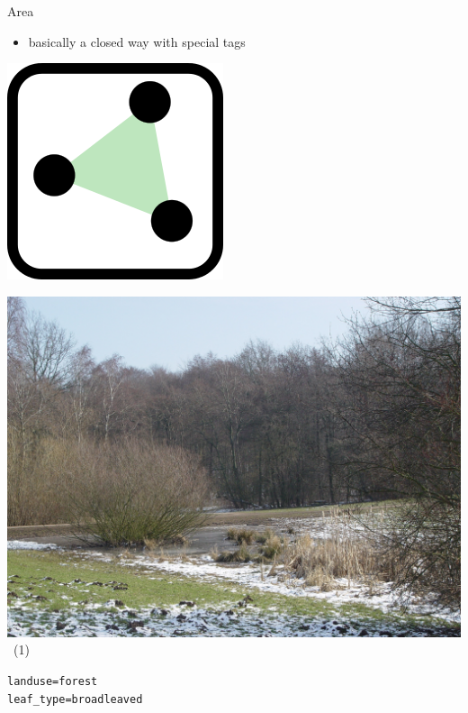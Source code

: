 \documentclass{beamer}
\begin{document}
	\begin{frame}{Area}
		\begin{itemize}
			\item basically a closed way with special tags
		\end{itemize}
		
		\vfill
		
		\begin{center}
			\begin{minipage}[b][0.6\textheight][c]{0.2\linewidth}
				\centering
				\includegraphics[width=0.5\linewidth,height=0.5\textheight,keepaspectratio]{images/240px-Mf_area.png}
			\end{minipage}
			\begin{minipage}[b][0.6\textheight][c]{0.4\linewidth}
				\centering
				\includegraphics[width=0.8\linewidth,height=0.8\textheight,keepaspectratio]{images/Stellinger_Feldmark_ESE_01.JPG}~\tiny{(1)}
			\end{minipage}
			\begin{minipage}[b][0.6\textheight][c]{0.3\linewidth}
				\texttt{landuse=forest}\\
				\texttt{leaf\_type=broadleaved}

\end{minipage}
\end{center}
\end{frame}
\end{document}

